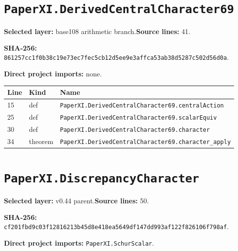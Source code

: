 \documentclass[10pt,oneside]{book}
\begin{document}
\section{\texorpdfstring{\nolinkurl{PaperXI.DerivedCentralCharacter69}}{PaperXI.DerivedCentralCharacter69}}\label{module:PaperXI.DerivedCentralCharacter69}

\textbf{Selected layer:} base108 arithmetic branch.\quad\textbf{Source lines:} 41.\par\textbf{SHA-256:} {\scriptsize\nolinkurl{861257cc1f0b38c19e73ec7fec5cb12d5ee9e3affca53ab38d5287c502d56d0a}}.


\textbf{Direct project imports:} none.

\begin{longtable}{@{}p{}p{}p{}@{}}\toprule Line&Kind&Name\\\midrule\endhead

15&def&\nolinkurl{PaperXI.DerivedCentralCharacter69.centralAction}\\

25&def&\nolinkurl{PaperXI.DerivedCentralCharacter69.scalarEquiv}\\

30&def&\nolinkurl{PaperXI.DerivedCentralCharacter69.character}\\

34&theorem&\nolinkurl{PaperXI.DerivedCentralCharacter69.character_apply}\\

\bottomrule\end{longtable}

\section{\texorpdfstring{\nolinkurl{PaperXI.DiscrepancyCharacter}}{PaperXI.DiscrepancyCharacter}}\label{module:PaperXI.DiscrepancyCharacter}

\textbf{Selected layer:} v0.44 parent.\quad\textbf{Source lines:} 50.\par\textbf{SHA-256:} {\scriptsize\nolinkurl{cf201fbd9c03f12816213b45d8e418ea5649df147dd993af122f826106f798af}}.


\textbf{Direct project imports:} \nolinkurl{PaperXI.SchurScalar}.
\end{document}
